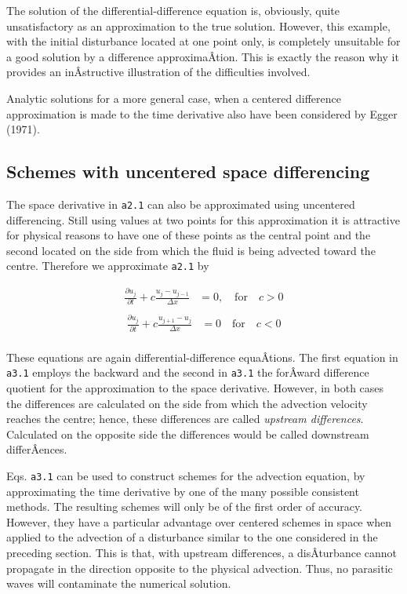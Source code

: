 The solution of the differential-difference equation is, obviously,
quite unsatisfactory as an approximation to the true solution. However,
this example, with the initial disturbance located at one point only, is
completely unsuitable for a good solution by a difference
approximaÂ­tion. This is exactly the reason why it provides an
inÂ­structive illustration of the difficulties involved.

Analytic solutions for a more general case, when a centered difference
approximation is made to the time derivative also have been considered
by Egger (1971).

\subsection{\texorpdfstring{\textbf{Schemes with uncentered space
differencing}}{Schemes with uncentered space differencing}}\label{schemes-with-uncentered-space-differencing}

The space derivative in \texttt{a2.1} can also be approximated using
uncentered differencing. Still using values at two points for this
approximation it is attractive for physical reasons to have one of these
points as the central point and the second located on the side from
which the fluid is being advected toward the centre. Therefore we
approximate \texttt{a2.1} by

{\[\begin{aligned}
\frac{\partial u_j}{\partial t} + c\frac{u_{j} - u_{j - 1}}{\Delta x} &= 0, \quad \textrm{for}
\quad c > 0 \\
\end{aligned}\]\[\begin{aligned}
\frac{\partial u_j}{\partial t} + c\frac{u_{j+1} - u_{j}}{\Delta x} &= 0 \quad \textrm{for}
\quad c < 0 \\
\end{aligned}\]}

These equations are again differential-difference equaÂ­tions. The first
equation in \texttt{a3.1} employs the backward and the second in
\texttt{a3.1} the forÂ­ward difference quotient for the approximation to
the space derivative. However, in both cases the differences are
calculated on the side from which the advection velocity reaches the
centre; hence, these differences are called \emph{upstream differences}.
Calculated on the opposite side the differences would be called
downstream differÂ­ences.

Eqs. \texttt{a3.1} can be used to construct schemes for the advection
equation, by approximating the time derivative by one of the many
possible consistent methods. The resulting schemes will only be of the
first order of accuracy. However, they have a particular advantage over
centered schemes in space when applied to the advection of a disturbance
similar to the one considered in the preceding section. This is that,
with upstream differences, a disÂ­turbance cannot propagate in the
direction opposite to the physical advection. Thus, no parasitic waves
will contaminate the numerical solution.

